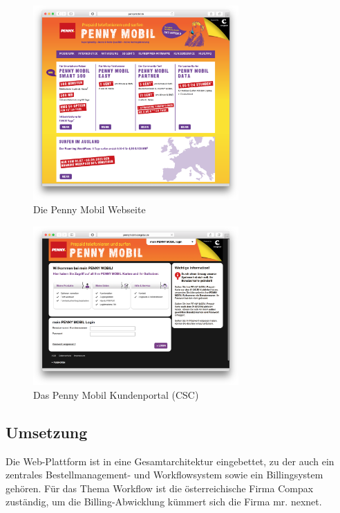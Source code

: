 \documentclass[11pt,a4paper]{article}
\begin{document}
\begin{figure}[H]
\includegraphics[width=0.7\textwidth]{images/Sites/White_Label/Penny_Mobil.png}
\centering
\caption{Die Penny Mobil Webseite \cite{penny}}
\end{figure}

\begin{figure}[H]
\includegraphics[width=0.7\textwidth]{images/Sites/White_Label/Penny_Mobil_CSC.png}
\centering
\caption{Das Penny Mobil Kundenportal (CSC) \cite{pennycsc}}
\end{figure}


\subsection{Umsetzung}

Die Web-Plattform ist in eine Gesamtarchitektur eingebettet, zu der auch ein zentrales Bestellmanagement- und Workflowsystem sowie ein Billingsystem gehören. Für das Thema Workflow ist die österreichische Firma Compax zuständig, um die Billing-Abwicklung kümmert sich die Firma mr. nexnet.
\end{document}
